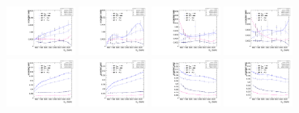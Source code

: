 \begin{figure}[htbp]
  \centering
  \includegraphics[width=0.2\textwidth]{fig/analysisAppendix/paramSignalYield_VBFSig_mu_HP_bb_LDy.pdf}
  \includegraphics[width=0.2\textwidth]{fig/analysisAppendix/paramSignalYield_VBFSig_e_HP_bb_LDy.pdf}
  \includegraphics[width=0.2\textwidth]{fig/analysisAppendix/paramSignalYield_VBFSig_mu_LP_bb_LDy.pdf}
  \includegraphics[width=0.2\textwidth]{fig/analysisAppendix/paramSignalYield_VBFSig_e_LP_bb_LDy.pdf}\\
  \includegraphics[width=0.2\textwidth]{fig/analysisAppendix/paramSignalYield_VBFSig_mu_HP_nobb_LDy.pdf}
  \includegraphics[width=0.2\textwidth]{fig/analysisAppendix/paramSignalYield_VBFSig_e_HP_nobb_LDy.pdf}
  \includegraphics[width=0.2\textwidth]{fig/analysisAppendix/paramSignalYield_VBFSig_mu_LP_nobb_LDy.pdf}
  \includegraphics[width=0.2\textwidth]{fig/analysisAppendix/paramSignalYield_VBFSig_e_LP_nobb_LDy.pdf}\\

\end{figure}
